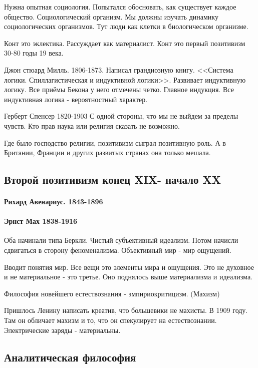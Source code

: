 Нужна опытная социология. Попытался обосновать, как существует каждое общество. Социологический организм. Мы должны изучать динамику социологических организмов. Тут люди как клетки в биологическом организме.

Конт это эклектика. Рассуждает как материалист. Конт это первый позитивизм 30-80 годы 19 века.

Джон стюард Милль. 1806-1873. Написал грандиозную книгу. <<Система логики. Спиллагистическая и индуктивной логики>>. Развивает индуктивную логику. Все приёмы Бекона у него отмечены четко. Главное индукция. Все индуктивная логика - вероятностный характер.

Герберт Спенсер 1820-1903 С одной стороны, что мы не выйдем за пределы чувств. Кто прав наука или религия сказать не возможно.

Где было господство религии, позитивизм сыграл позитивную роль. А в Британии, Франции и других развитых странах она только мешала.

\subsection{Второй позитивизм конец XIX- начало XX}

\paragraph{Рихард Авенариус. 1843-1896}

\paragraph{Эрнст Мах 1838-1916}

Оба начинали типа Беркли. Чистый субъективный идеализм. Потом начисли сдвигаться в сторону феноменализма. Объективный мир - мир ощущений.

Вводит понятия мир. Все вещи это элементы мира и ощущения. Это не духовное и не материальное - это третье. Оно поднялось выше материализма и идеализма.

    Философия новейшего естествознания - эмпириокритицизм. (Махизм)

Пришлось Ленину написать креатив, что большевики не махисты. В 1909 году. Там он обличает махизм и то, что он спекулирует на естествознании. Электрические заряды - материальны.

\subsection{Аналитическая философия}

